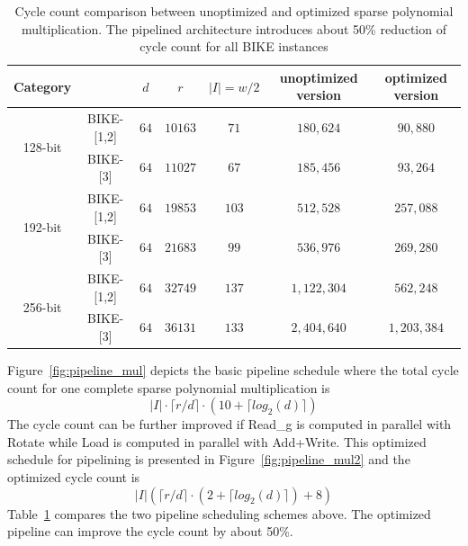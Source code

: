 \documentclass[runningheads]{llncs}
\begin{document}
\begin{table}[!tb]\centering
\caption{Cycle count comparison between unoptimized and optimized sparse polynomial multiplication. The pipelined architecture introduces about 50\% reduction of cycle count for all BIKE instances}
\begin{tabular}{cc|ccccc}
  \hline
 \textbf{Category}        &             & $d$ & $r$  & $|I|=w/2$  & unoptimized version& optimized version\\\hline
\multirow{ 2}{*}{128-bit} &  BIKE-[1,2] & $64$ & $10163$  & $71$  & $180,624$ & $90,880$\\
                          &  BIKE-[3] & $64$ & $11027$  & $67$  & $185,456$& $93,264$\\
  \hline
\multirow{ 2}{*}{192-bit} &  BIKE-[1,2] & $64$ & $19853$  & $103$  &$512,528$& $257,088$\\
                          &  BIKE-[3] & $64$ & $21683$  & $99$  &$536,976$& $269,280$\\
  \hline
\multirow{ 2}{*}{256-bit} &  BIKE-[1,2] & $64$ & $32749$  & $137$  &$1,122,304$& $562,248$\\
                          &  BIKE-[3] & $64$ & $36131$  & $133$  &$2,404,640$& $1,203,384$\\
  \hline
\end{tabular}
\label{tab::sparse}
\end{table}

Figure~\ref{fig:pipeline_mul} depicts the basic pipeline schedule where the total cycle count for one complete sparse polynomial multiplication is
\[
    |I|\cdot\lceil r/d\rceil\cdot (10+\lceil log_2(d)\rceil)
\]
The cycle count can be further improved if Read\_g is computed in parallel
with Rotate while Load is computed in parallel with Add+Write.
This optimized schedule for pipelining is presented in Figure~\ref{fig:pipeline_mul2}
and the optimized cycle count is
\[
    |I|(\lceil r/d\rceil\cdot (2+\lceil log_2(d)\rceil) + 8)
\]
Table~\ref{tab::sparse} compares the two pipeline scheduling schemes above. The optimized pipeline can improve the cycle count by about 50\%.
\end{document}
